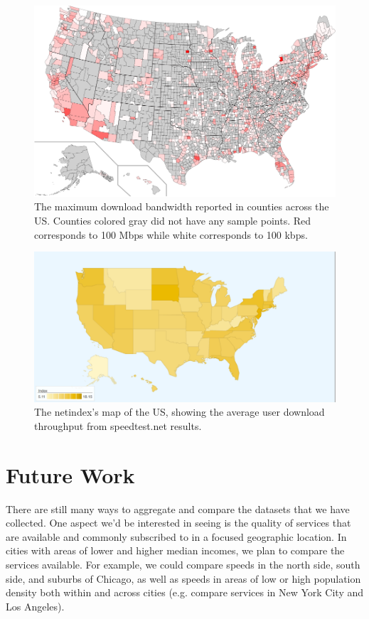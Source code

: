 \documentclass{sig-alternate-10pt}
\begin{document}
\begin{figure}
\centering
        \includegraphics[width=0.9\linewidth]{figs/counties_btMaxDown.pdf}
  \caption{The maximum download bandwidth reported in counties across the 
US.  Counties colored gray did not have any sample points.  Red corresponds
to 100 Mbps while white corresponds to 100 kbps.}
  \label{fig:services-btMaxDown}
\end{figure}

\begin{figure}
\centering
        \includegraphics[width=0.9\linewidth]{figs/map.pdf}
  \caption{The netindex's map of the US, showing the average 
user download throughput from speedtest.net results.}
  \label{fig:services-net-index-map}
\end{figure}

\section{Future Work}
\label{sec:future-work} 

There are still many ways to aggregate and compare the datasets that we have
collected.  One aspect we'd be interested in seeing is the quality of services
that are available and commonly subscribed to in a focused geographic location.
In cities with areas of lower and higher median incomes, we plan to compare the
services available. For example, we could compare speeds in the north side,
south side, and suburbs of Chicago, as well as speeds in areas of low or high
population density both within and across cities (e.g. compare services in New
York City and Los Angeles).  
\end{document}
